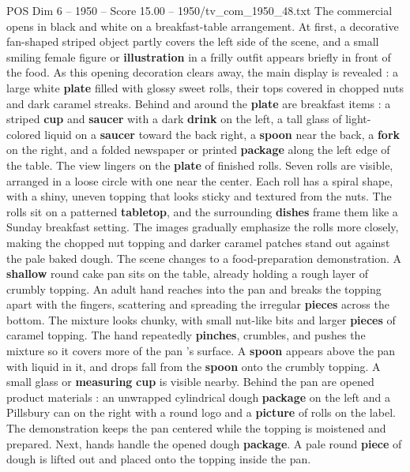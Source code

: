 \begin{textsample}{POS Dim 6 – 1950 – Score 15.00 – 1950/tv\_com\_1950\_48.txt}  \label{ex:f6_pos_004}
The commercial opens in black and white on a breakfast-table arrangement.
At first, a decorative fan-shaped striped object partly covers the left side of the scene, and a small smiling female figure or \textbf{illustration} in a frilly outfit appears briefly in front of the food.
As this opening decoration clears away, the main display is revealed : a large white \textbf{plate} filled with glossy sweet rolls, their tops covered in chopped nuts and dark caramel streaks.
Behind and around the \textbf{plate} are breakfast items : a striped \textbf{cup} and \textbf{saucer} with a dark \textbf{drink} on the left, a tall glass of light-colored liquid on a \textbf{saucer} toward the back right, a \textbf{spoon} near the back, a \textbf{fork} on the right, and a folded newspaper or printed \textbf{package} along the left edge of the table.
The view lingers on the \textbf{plate} of finished rolls.
Seven rolls are visible, arranged in a loose circle with one near the center.
Each roll has a spiral shape, with a shiny, uneven topping that looks sticky and textured from the nuts.
The rolls sit on a patterned \textbf{tabletop}, and the surrounding \textbf{dishes} frame them like a Sunday breakfast setting.
The images gradually emphasize the rolls more closely, making the chopped nut topping and darker caramel patches stand out against the pale baked dough.
The scene changes to a food-preparation demonstration.
A \textbf{shallow} round cake pan sits on the table, already holding a rough layer of crumbly topping.
An adult hand reaches into the pan and breaks the topping apart with the fingers, scattering and spreading the irregular \textbf{pieces} across the bottom.
The mixture looks chunky, with small nut-like bits and larger \textbf{pieces} of caramel topping.
The hand repeatedly \textbf{pinches}, crumbles, and pushes the mixture so it covers more of the pan ’s surface.
A \textbf{spoon} appears above the pan with liquid in it, and drops fall from the \textbf{spoon} onto the crumbly topping.
A small glass or \textbf{measuring} \textbf{cup} is visible nearby.
Behind the pan are opened product materials : an unwrapped cylindrical dough \textbf{package} on the left and a Pillsbury can on the right with a round logo and a \textbf{picture} of rolls on the label.
The demonstration keeps the pan centered while the topping is moistened and prepared.
Next, hands handle the opened dough \textbf{package}.
A pale round \textbf{piece} of dough is lifted out and placed onto the topping inside the pan.

\end{textsample}
